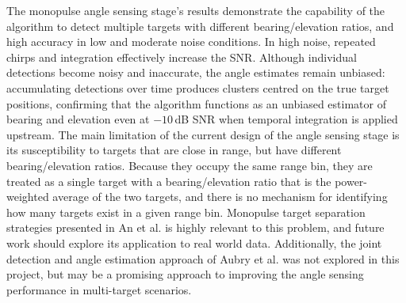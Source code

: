The monopulse angle sensing stage's results demonstrate the capability
of the algorithm to detect multiple targets with different bearing/elevation ratios,
and high accuracy in low and moderate noise conditions. In high noise,
repeated chirps and integration effectively increase the SNR. Although individual
detections become noisy and inaccurate, the angle estimates remain unbiased:
accumulating detections over time produces clusters centred on the true target
positions, confirming that the algorithm functions as an unbiased estimator of
bearing and elevation even at $-10$\,dB SNR when temporal integration is applied
upstream. The main limitation of the current 
design of the angle sensing stage is its susceptibility to targets
that are close in range, but have different bearing/elevation ratios. 
Because they occupy the same range bin, they are treated as a single target
with a bearing/elevation ratio that is the power-weighted average of the 
two targets, and there is no mechanism for identifying how many targets
exist in a given range bin. Monopulse target separation strategies 
presented in An et al. 
\cite{an2024_time_varying_angle_estimation_unresolved_extended_targets_monopulse}
is highly relevant to this problem, and future work should explore its application 
to real world data. Additionally, the joint detection and angle estimation approach 
of Aubry et al. 
\cite{aubry2020_single_pulse_simultaneous_detection_angle_estimation_multichannel}
was not explored in this project, but may be a promising approach to improving the 
angle sensing performance in multi-target scenarios. 

